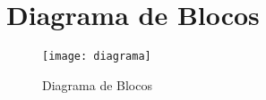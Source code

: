 \section{Diagrama de Blocos}

    \begin{figure} [H] 
        \texttt{[image: diagrama]}
        \caption{Diagrama de Blocos}
        \label{fig:diagram}
    \end{figure}